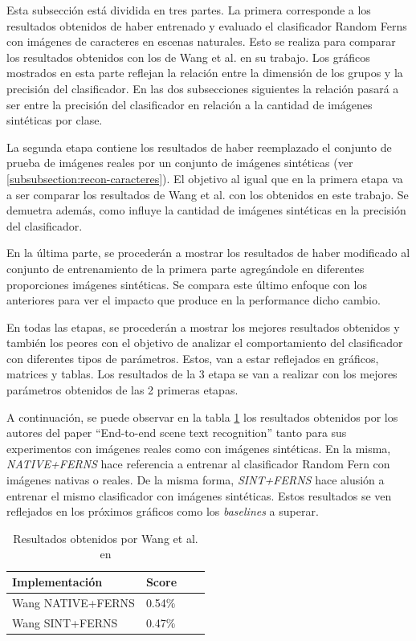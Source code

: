 	Esta subsección está dividida en tres partes. La primera corresponde a los resultados obtenidos de haber entrenado y evaluado el clasificador Random Ferns con imágenes de caracteres en escenas naturales. Esto se realiza para comparar los resultados obtenidos con los de Wang et al. en su trabajo. Los gráficos mostrados en esta parte reflejan la relación entre la dimensión de los grupos y la precisión del clasificador. En las dos subsecciones siguientes la relación pasará a ser entre la precisión del clasificador en relación a la cantidad de imágenes sintéticas por clase.
	
	La segunda etapa contiene los resultados de haber reemplazado el conjunto de prueba de imágenes reales por un conjunto de imágenes sintéticas (ver \ref{subsubsection:recon-caracteres}). El objetivo al igual que en la primera etapa va a ser comparar los resultados de Wang et al. con los obtenidos en este trabajo. Se demuetra además, como influye la cantidad de imágenes sintéticas en la precisión del clasificador.
	
	En la última parte, se procederán a mostrar los resultados de haber modificado al conjunto de entrenamiento de la primera parte agregándole en diferentes proporciones imágenes sintéticas. Se compara este último enfoque con los anteriores para ver el impacto que produce en la performance dicho cambio.
	
	En todas las etapas, se procederán a mostrar los mejores resultados obtenidos y también los peores con el objetivo de analizar el comportamiento del clasificador con diferentes tipos de parámetros. Estos, van a estar reflejados en gráficos, matrices y tablas. Los resultados de la 3 etapa se van a realizar con los mejores parámetros obtenidos de las 2 primeras etapas.
	
	A continuación, se puede observar en la tabla \ref{table: Wang paper} los resultados obtenidos por los autores del paper ``End-to-end scene text recognition'' tanto para sus experimentos con imágenes reales como con imágenes sintéticas. En la misma, \textit{NATIVE+FERNS} hace referencia a entrenar al clasificador Random Fern con imágenes nativas o reales. De la misma forma, \textit{SINT+FERNS} hace alusión a entrenar el mismo clasificador con imágenes sintéticas. Estos resultados se ven reflejados en los próximos gráficos como los \textit{baselines} a superar.
	
	\begin{table}
		\centering
	    \begin{tabular}{ | l | l | l | p{5cm} |}
    			\hline
    				\textbf{Implementación} & \textbf{Score} \\ \hline
    				Wang NATIVE+FERNS & 0.54\% \\ \hline
    				Wang SINT+FERNS & 0.47\% \\
    			\hline
    		\end{tabular}	
    		\caption[Resultados reales y sintéticas de Wang]{Resultados obtenidos por Wang et al. en \cite{wang}}
    		\label{table: Wang paper}
	\end{table}

